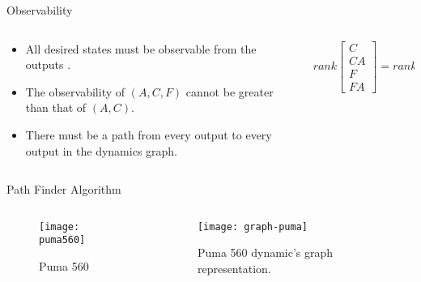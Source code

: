 \begin{slide}{Observability}
  \begin{columns}[c]
    \begin{column}{0.48\textwidth}
      \begin{itemize}
        \item All desired states \z{} must be observable from the outputs \y.
        \item The observability of \((A,C,F)\) cannot be greater than that of
              \((A,C)\).
        \item There must be a path from every output \y{} to every output \z{}
              in the dynamics graph.
      \end{itemize}
    \end{column}%
    \hfill%
    \begin{column}{0.48\textwidth}
      \begin{equation}
        rank
        \begin{bmatrix}
          C \\ CA \\ F \\ FA
        \end{bmatrix}
        = rank
        \begin{bmatrix}
          C \\ CA \\ F
        \end{bmatrix}.
      \end{equation}
    \end{column}%
  \end{columns}
\end{slide}

\begin{slide}{Path Finder Algorithm}
  \begin{columns}[c]
    \begin{column}{0.48\textwidth}
      \begin{figure}[ht!]
        \centering \texttt{[image: puma560]}
        \caption{Puma 560}%
        \label{fig:puma}
      \end{figure}
    \end{column}%
    \hfill%
    \begin{column}{0.48\textwidth}
      \begin{figure}[ht!]
        \centering
        \texttt{[image: graph-puma]}
        \caption{Puma 560 dynamic's graph representation.}%
        \label{fig:puma-graph}
      \end{figure}
    \end{column}%
  \end{columns}
\end{slide}
